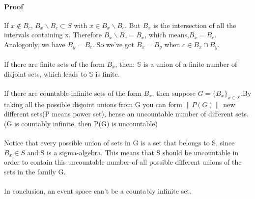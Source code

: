 \documentclass[UTF8]{ctexart}
\begin{document}
\paragraph{Proof} If $x \notin B_c$, $B_x \backslash B_c \subset S$ with $x \in B_x \backslash B_c$. But $B_x$ is the intersection of all the intervals containing x. Therefore $B_x \backslash B_c = B_x$, which means,$B_x = B_c$.\\
Analogouly, we have $B_y = B_c$. So we've got $B_x = B_y$ when $c \in B_x \cap B_y$.
\\\\
If there are finite sets of the form $B_x$, then: $\mathbb{S}$ is a union of a finite number of disjoint sets, which leads to $\mathbb{S}$ is finite.
\\\\
If there are countable-infinite sets of the form $B_x$, then suppose $G=\{B_x\}_{x\in X}$.By taking all the possible disjoint unions from G you can form $\|P(G)\|$ new different sets(P means power set), hense an uncountable number of different sets.(G is countably infinite, then P(G) is uncountable)
\\\\
Notice that every possible union of sets in G is a set that belongs to S, since $B_x \in S$ and S is a sigma-algebra. This means that S should be uncountable in order to contain this uncountable number of all possible different unions of the sets in the family G.
\\\\
In conclusion, an event space can't be a countably infinite set.
\end{document}
